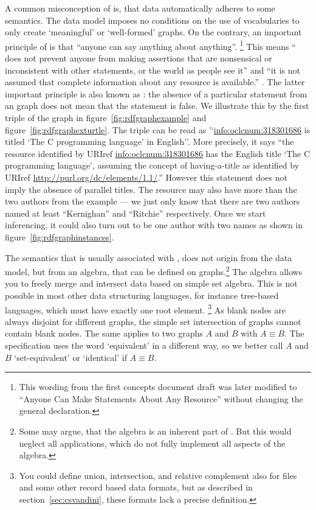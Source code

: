 A common misconception of  is, that  data automatically 
adheres to some semantics. The  data model imposes no conditions
on the use of  vocabularies to only create `meaningful' or 
`well-formed'  graphs. On the contrary, an important principle 
of  is that ``anyone can say anything about anything''.%
\footnote{This wording from the first  concepts document
draft \cite{Klyne2004} was later modified to ``Anyone Can Make Statements About
Any Resource'' without changing the general declaration.} This means
`` does not prevent anyone from making assertions that 
are nonsensical or inconsistent with other statements, or the world as 
people see it'' and ``it is not assumed that complete information about 
any resource is  available.'' \cite{Klyne2004}. The latter important 
principle is also known as : the absence
of a particular statement from an  graph does not mean that the 
statement is false. We illustrate this by the first triple of the graph 
in figure~\ref{fig:rdfgraphexample} and figure~\ref{fig:rdfgraphexturtle}.
The triple can be read as '`\url{info:oclcnum:318301686} is titled
`The C programming language' in English''. More precisely, it says
``the resource identified by URIref \url{info:oclcnum:318301686} has 
the English title `The C programming language', assuming the concept of 
having-a-title as identified by URIref \url{http://purl.org/dc/elements/1.1/}.''
However this statement does not imply the absence of parallel titles. The
resource may also have more than the two authors from the example --- 
we just only know that there are two authors named at least ``Kernighan'' 
and ``Ritchie'' respectively. Once we start inferencing, it could also
turn out to be one author with two names as shown in
figure~\ref{fig:rdfgraphinstances}.

The semantics that is usually associated with , does not origin 
from the  data model, but from an algebra, that can be defined on 
 graphs.\footnote{Some may argue, that the algebra is an
inherent part of . But this would neglect all  
applications, which do not fully implement all aspects of the  
algebra.} The algebra allows you to freely merge and 
intersect  data based on simple set algebra. This is not possible 
in most other data structuring languages, for instance tree-based languages, 
which must have exactly one root element.%
\footnote{You could define union, intersection, and relative complement 
also for  files and some other record based data formats, but as described
in section~\ref{sec:csvandini}, these formats lack a precise definition.}
As blank nodes are always disjoint for different graphs, the simple set 
intersection of  graphs cannot contain blank nodes. The same applies
to two  graphs $A$ and $B$ with $A\equiv B$. The  specification
uses the word `equivalent' in a different way, so we better call $A$ and $B$
`set-equivalent' or `identical' if $A\equiv B$. 

